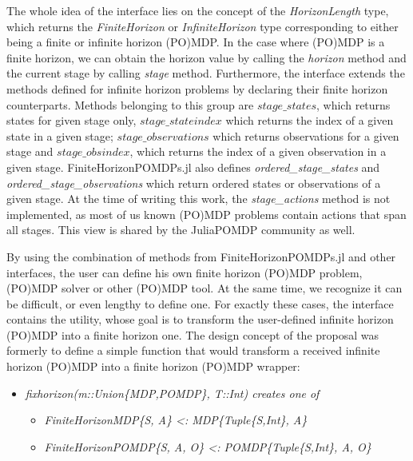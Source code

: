 The whole idea of the interface lies on the concept of the \textit{HorizonLength} type, which returns the \textit{FiniteHorizon} or \textit{InfiniteHorizon} type corresponding to either being a finite or infinite horizon (PO)MDP. In the case where (PO)MDP is a finite horizon, we can obtain the horizon value by calling the \textit{horizon} method and the current stage by calling \textit{stage} method. Furthermore, the interface extends the methods defined for infinite horizon problems by declaring their finite horizon counterparts. Methods belonging to this group are $stage\_states$, which returns states for given stage only, $stage\_stateindex$ which returns the index of a given state in a given stage; $ stage\_observations$ which returns observations for a given stage and $stage\_obsindex$, which returns the index of a given observation in a given stage. FiniteHorizonPOMDPs.jl also defines \textit{ordered\_stage\_states} and \textit{ordered\_stage\_observations} which return ordered states or observations of a given stage. At the time of writing this work, the \textit{stage\_actions} method is not implemented, as most of us known (PO)MDP problems contain actions that span all stages. This view is shared by the JuliaPOMDP community as well.

By using the combination of methods from FiniteHorizonPOMDPs.jl and other interfaces, the user can define his own finite horizon (PO)MDP problem, (PO)MDP solver or other (PO)MDP tool. At the same time, we recognize it can be difficult, or even lengthy to define one. For exactly these cases, the interface contains the utility, whose goal is to transform the user-defined infinite horizon (PO)MDP into a finite horizon one.  The design concept of the proposal was formerly to define a simple function that would transform a received infinite horizon (PO)MDP into a finite horizon (PO)MDP wrapper:

\begin{samepage}
\begin{itemize}
    \item \textit{fixhorizon(m::Union\{MDP,POMDP\}, T::Int) creates one of}
    \begin{itemize}
        \item \textit{FiniteHorizonMDP\{S, A\} <: MDP\{Tuple\{S,Int\}, A\}}
        \item \textit{FiniteHorizonPOMDP\{S, A, O\} <: POMDP\{Tuple\{S,Int\}, A, O\}}
    \end{itemize}
\end{itemize}
\end{samepage}


